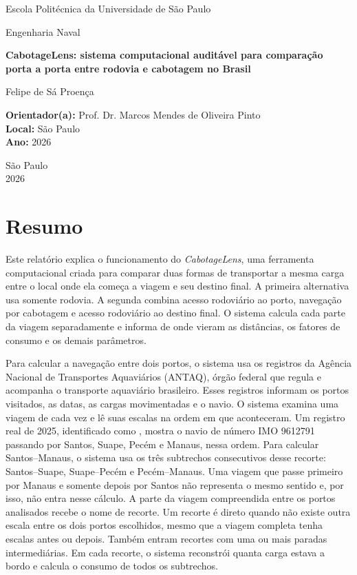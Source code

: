 \documentclass[12pt,a4paper,oneside]{report}
\newcommand{\CabotageLens}{\textit{CabotageLens}}
\newcommand{\codecell}[1]{\texttt{\seqsplit{#1}}}
\newcommand{\reporttitle}{CabotageLens: sistema computacional auditável para comparação porta a porta entre rodovia e cabotagem no Brasil}
\newcommand{\reportauthor}{Felipe de Sá Proença}
\newcommand{\reportadvisor}{Prof. Dr. Marcos Mendes de Oliveira Pinto}
\newcommand{\reportinstitution}{Escola Politécnica da Universidade de São Paulo}
\newcommand{\reportcourse}{Engenharia Naval}
\newcommand{\reportlocation}{São Paulo}
\newcommand{\reportyear}{2026}
\begin{document}

\begin{titlepage}
\centering
{\large \reportinstitution\par}
\vspace{0.5cm}
{\large \reportcourse\par}
\vfill
{\Large\bfseries \reporttitle\par}
\vspace{1.5cm}
{\large \reportauthor\par}
\vfill
\begin{flushleft}
\textbf{Orientador(a):} \reportadvisor\\
\textbf{Local:} \reportlocation\\
\textbf{Ano:} \reportyear
\end{flushleft}
\vspace{1cm}
{\reportlocation\\\reportyear\par}
\end{titlepage}


\chapter*{Resumo}
Este relatório explica o funcionamento do \CabotageLens{}, uma ferramenta computacional criada para comparar duas formas de transportar a mesma carga entre o local onde ela começa a viagem e seu destino final. A primeira alternativa usa somente rodovia. A segunda combina acesso rodoviário ao porto, navegação por cabotagem e acesso rodoviário ao destino final. O sistema calcula cada parte da viagem separadamente e informa de onde vieram as distâncias, os fatores de consumo e os demais parâmetros.

Para calcular a navegação entre dois portos, o sistema usa os registros da Agência Nacional de Transportes Aquaviários (ANTAQ), órgão federal que regula e acompanha o transporte aquaviário brasileiro. Esses registros informam os portos visitados, as datas, as cargas movimentadas e o navio. O sistema examina uma viagem de cada vez e lê suas escalas na ordem em que aconteceram. Um registro real de 2025, identificado como \codecell{voyage\_9612791\_00011}, mostra o navio de número IMO 9612791 passando por Santos, Suape, Pecém e Manaus, nessa ordem. Para calcular Santos--Manaus, o sistema usa os três subtrechos consecutivos desse recorte: Santos--Suape, Suape--Pecém e Pecém--Manaus. Uma viagem que passe primeiro por Manaus e somente depois por Santos não representa o mesmo sentido e, por isso, não entra nesse cálculo. A parte da viagem compreendida entre os portos analisados recebe o nome de recorte. Um recorte é direto quando não existe outra escala entre os dois portos escolhidos, mesmo que a viagem completa tenha escalas antes ou depois. Também entram recortes com uma ou mais paradas intermediárias. Em cada recorte, o sistema reconstrói quanta carga estava a bordo e calcula o consumo de todos os subtrechos.
\end{document}
